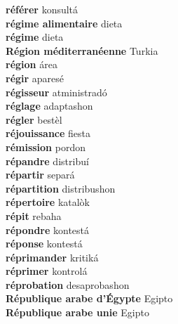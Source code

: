 \textbf{ référer  } konsultá \\
\textbf{ régime alimentaire  } dieta \\
\textbf{ régime  } dieta \\
\textbf{ Région méditerranéenne  } Turkia \\
\textbf{ région  } área \\
\textbf{ régir  } aparesé \\
\textbf{ régisseur  } atministradó \\
\textbf{ réglage  } adaptashon \\
\textbf{ régler  } bestèl \\
\textbf{ réjouissance  } fiesta \\
\textbf{ rémission  } pordon \\
\textbf{ répandre  } distribuí \\
\textbf{ répartir  } separá \\
\textbf{ répartition  } distribushon \\
\textbf{ répertoire  } katalòk \\
\textbf{ répit  } rebaha \\
\textbf{ répondre  } kontestá \\
\textbf{ réponse  } kontestá \\
\textbf{ réprimander  } kritiká \\
\textbf{ réprimer  } kontrolá \\
\textbf{ réprobation  } desaprobashon \\
\textbf{ République arabe d’Égypte  } Egipto \\
\textbf{ République arabe unie  } Egipto \\
